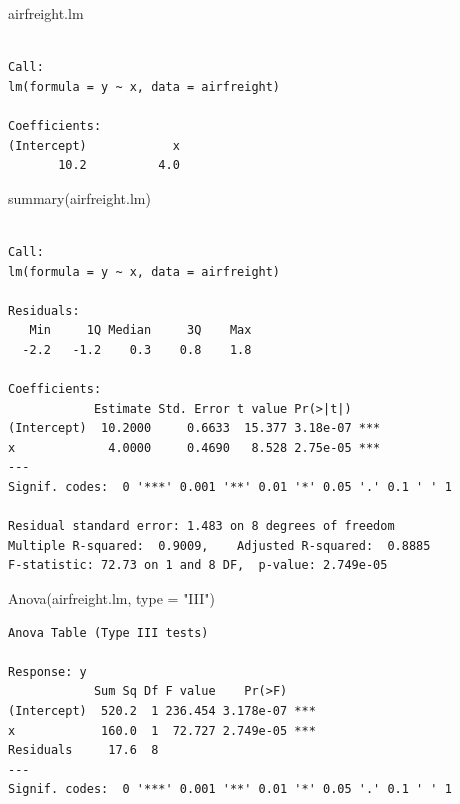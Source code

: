 \documentclass[
  letterpaper,
  DIV=11,
  numbers=noendperiod]{scrartcl}
\newenvironment{Shaded}{\begin{snugshade}}{\end{snugshade}}
\newcommand{\AttributeTok}[1]{\textcolor[rgb]{0.40,0.45,0.13}{#1}}
\newcommand{\FunctionTok}[1]{\textcolor[rgb]{0.28,0.35,0.67}{#1}}
\newcommand{\NormalTok}[1]{\textcolor[rgb]{0.00,0.23,0.31}{#1}}
\newcommand{\StringTok}[1]{\textcolor[rgb]{0.13,0.47,0.30}{#1}}
\begin{document}
\begin{Shaded}
\begin{Highlighting}[]
\NormalTok{airfreight.lm}
\end{Highlighting}
\end{Shaded}

\begin{verbatim}

Call:
lm(formula = y ~ x, data = airfreight)

Coefficients:
(Intercept)            x  
       10.2          4.0  
\end{verbatim}

\begin{Shaded}
\begin{Highlighting}[]
\FunctionTok{summary}\NormalTok{(airfreight.lm)}
\end{Highlighting}
\end{Shaded}

\begin{verbatim}

Call:
lm(formula = y ~ x, data = airfreight)

Residuals:
   Min     1Q Median     3Q    Max 
  -2.2   -1.2    0.3    0.8    1.8 

Coefficients:
            Estimate Std. Error t value Pr(>|t|)    
(Intercept)  10.2000     0.6633  15.377 3.18e-07 ***
x             4.0000     0.4690   8.528 2.75e-05 ***
---
Signif. codes:  0 '***' 0.001 '**' 0.01 '*' 0.05 '.' 0.1 ' ' 1

Residual standard error: 1.483 on 8 degrees of freedom
Multiple R-squared:  0.9009,    Adjusted R-squared:  0.8885 
F-statistic: 72.73 on 1 and 8 DF,  p-value: 2.749e-05
\end{verbatim}

\begin{Shaded}
\begin{Highlighting}[]
\FunctionTok{Anova}\NormalTok{(airfreight.lm, }\AttributeTok{type =} \StringTok{"III"}\NormalTok{)}
\end{Highlighting}
\end{Shaded}

\begin{verbatim}
Anova Table (Type III tests)

Response: y
            Sum Sq Df F value    Pr(>F)    
(Intercept)  520.2  1 236.454 3.178e-07 ***
x            160.0  1  72.727 2.749e-05 ***
Residuals     17.6  8                      
---
Signif. codes:  0 '***' 0.001 '**' 0.01 '*' 0.05 '.' 0.1 ' ' 1
\end{verbatim}
\end{document}
